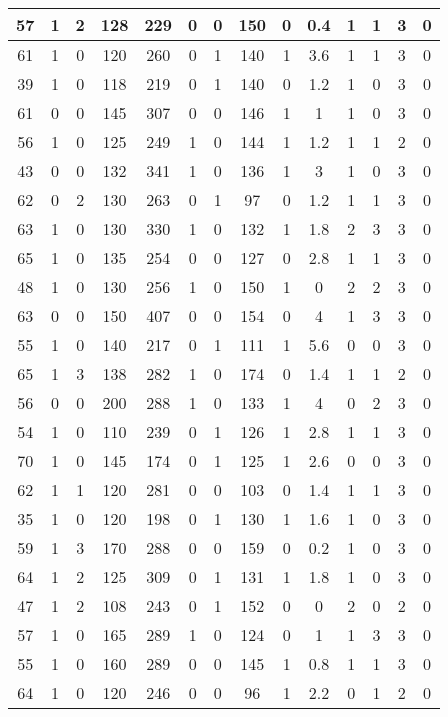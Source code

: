 \documentclass{article}
\begin{document}
\begin{longtable}{|c|c|c|c|c|c|c|c|c|c|c|c|c|c|}
57 & 1 & 2 & 128 & 229 & 0 & 0 & 150 & 0 & 0.4 & 1 & 1 & 3 & 0 \\ \hline
61 & 1 & 0 & 120 & 260 & 0 & 1 & 140 & 1 & 3.6 & 1 & 1 & 3 & 0 \\ \hline
39 & 1 & 0 & 118 & 219 & 0 & 1 & 140 & 0 & 1.2 & 1 & 0 & 3 & 0 \\ \hline
61 & 0 & 0 & 145 & 307 & 0 & 0 & 146 & 1 & 1 & 1 & 0 & 3 & 0 \\ \hline
56 & 1 & 0 & 125 & 249 & 1 & 0 & 144 & 1 & 1.2 & 1 & 1 & 2 & 0 \\ \hline
43 & 0 & 0 & 132 & 341 & 1 & 0 & 136 & 1 & 3 & 1 & 0 & 3 & 0 \\ \hline
62 & 0 & 2 & 130 & 263 & 0 & 1 & 97 & 0 & 1.2 & 1 & 1 & 3 & 0 \\ \hline
63 & 1 & 0 & 130 & 330 & 1 & 0 & 132 & 1 & 1.8 & 2 & 3 & 3 & 0 \\ \hline
65 & 1 & 0 & 135 & 254 & 0 & 0 & 127 & 0 & 2.8 & 1 & 1 & 3 & 0 \\ \hline
48 & 1 & 0 & 130 & 256 & 1 & 0 & 150 & 1 & 0 & 2 & 2 & 3 & 0 \\ \hline
63 & 0 & 0 & 150 & 407 & 0 & 0 & 154 & 0 & 4 & 1 & 3 & 3 & 0 \\ \hline
55 & 1 & 0 & 140 & 217 & 0 & 1 & 111 & 1 & 5.6 & 0 & 0 & 3 & 0 \\ \hline
65 & 1 & 3 & 138 & 282 & 1 & 0 & 174 & 0 & 1.4 & 1 & 1 & 2 & 0 \\ \hline
56 & 0 & 0 & 200 & 288 & 1 & 0 & 133 & 1 & 4 & 0 & 2 & 3 & 0 \\ \hline
54 & 1 & 0 & 110 & 239 & 0 & 1 & 126 & 1 & 2.8 & 1 & 1 & 3 & 0 \\ \hline
70 & 1 & 0 & 145 & 174 & 0 & 1 & 125 & 1 & 2.6 & 0 & 0 & 3 & 0 \\ \hline
62 & 1 & 1 & 120 & 281 & 0 & 0 & 103 & 0 & 1.4 & 1 & 1 & 3 & 0 \\ \hline
35 & 1 & 0 & 120 & 198 & 0 & 1 & 130 & 1 & 1.6 & 1 & 0 & 3 & 0 \\ \hline
59 & 1 & 3 & 170 & 288 & 0 & 0 & 159 & 0 & 0.2 & 1 & 0 & 3 & 0 \\ \hline
64 & 1 & 2 & 125 & 309 & 0 & 1 & 131 & 1 & 1.8 & 1 & 0 & 3 & 0 \\ \hline
47 & 1 & 2 & 108 & 243 & 0 & 1 & 152 & 0 & 0 & 2 & 0 & 2 & 0 \\ \hline
57 & 1 & 0 & 165 & 289 & 1 & 0 & 124 & 0 & 1 & 1 & 3 & 3 & 0 \\ \hline
55 & 1 & 0 & 160 & 289 & 0 & 0 & 145 & 1 & 0.8 & 1 & 1 & 3 & 0 \\ \hline
64 & 1 & 0 & 120 & 246 & 0 & 0 & 96 & 1 & 2.2 & 0 & 1 & 2 & 0 \\ \hline

\end{longtable}
\end{document}
